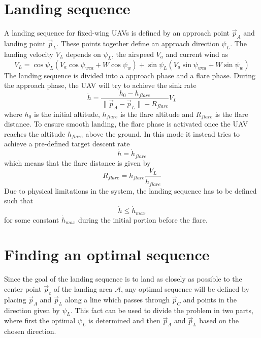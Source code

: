 \section{Landing sequence}
A landing sequence for fixed-wing UAVs is defined by an approach point $\vec{p}_A$ and landing point $\vec{p}_L$. These points together 
define an approach direction $\psi_L$. The landing velocity $V_L$ depends on $\psi_L$, the airspeed $V_a$ and current wind as 
\begin{equation}
    V_L=\cos\psi_L(V_a\cos\psi_{wca}+W\cos\psi_w) + \sin\psi_L(V_a\sin\psi_{wca}+W\sin\psi_w)
\end{equation}
The landing sequence is divided into a approach phase and a flare phase. During the approach phase, the UAV will try to 
achieve the sink rate 
\begin{equation}
    \dot{h}=\frac{h_0-h_{flare}}{\|\vec{p}_A-\vec{p}_L\|-R_{flare}}V_L
\end{equation}
where $h_0$ is the initial altitude, $h_{flare}$ is the flare altitude and $R_{flare}$ is the flare distance.
To ensure smooth landing, the flare phase is activated once the UAV reaches the altitude $h_{flare}$ above the ground. 
In this mode it instead tries to achieve a pre-defined target descent rate 
\begin{equation}
    \dot{h}=\dot{h}_{flare}
\end{equation}
which means that the flare distance is given by
\begin{equation}\label{eq:r_flare}
    R_{flare}=h_{flare}\frac{V_L}{\dot{h}_{flare}}
\end{equation}
Due to physical limitations in the system, the landing sequence has to be defined such that 
\begin{equation}\label{eq:sink_constraint}
    \dot{h}\leq\dot{h}_{max}
\end{equation}
for some constant $\dot{h}_{max}$ during the initial portion before the flare.

\section{Finding an optimal sequence}
Since the goal of the landing sequence is to land as closely as possible to the center point $\vec{p}_c$ of the landing area $\mathcal{A}$, any 
optimal sequence will be defined by placing $\vec{p}_A$ and $\vec{p}_L$ along a line which passes through $\vec{p}_C$ and points in the direction given by $\psi_L$.
This fact can be used to divide the problem in two parts, where first the optimal $\psi_L$ is determined and then $\vec{p}_A$ and $\vec{p}_L$ based on the chosen direction.

